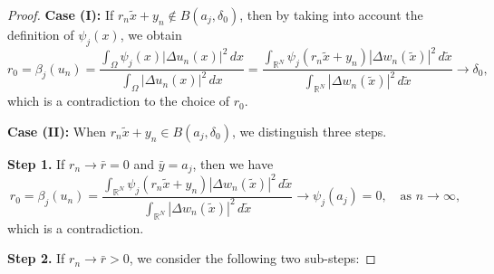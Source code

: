 \documentclass[reqno]{amsart}
\begin{document}
\begin{proof}
\noindent\textbf{Case (I):} 
If \( r_n\tilde{x}+y_n \notin B(a_j, \delta_0)\), then by taking into account the 
definition of \(\psi_j(x)\), we obtain
\[
 r_0=\beta_j(u_n)=\frac{\int_{\Omega} \psi_{j}(x)|\Delta u_n(x)|^2\,dx}
 {\int_{\Omega} |\Delta u_n(x)|^2\,dx}
 =\frac{\int_{\mathbb{R}^N} \psi_{j}(r_n\tilde{x}+y_n)|\Delta w_n(\tilde{x})|^2
 \,d\tilde{x}}{\int_{\mathbb{R}^N} |\Delta w_n(\tilde{x})|^2\,d\tilde{x}} \to \delta_0,
\]
which is a contradiction to the choice of \(r_0\).
\smallskip

\noindent \textbf{Case (II):} When \(r_n\tilde{x}+y_n \in B(a_j, \delta_0)\), we 
distinguish three steps.
\smallskip

\noindent\textbf{Step 1.} If \(r_n\to \bar{r}=0\) and \(\bar {y}=a_j\), then we have
 \[
 r_0=\beta_j(u_n)=\frac{\int_{\mathbb{R}^N} \psi_{j}(r_n\tilde{x}+y_n)|\Delta
  w_n(\tilde{x})|^2\,d\tilde{x}}
 {\int_{\mathbb{R}^N} |\Delta w_n(\tilde{x})|^2\,d\tilde{x}} \to \psi_j(a_j)=0, 
 \quad\text{as } n\to \infty,
 \]
which is a contradiction.
\smallskip

\noindent\textbf{Step 2.} If \(r_n\to \bar{r}>0\), we consider the following two 
sub-steps:
\smallskip


\end{proof}
\end{document}
